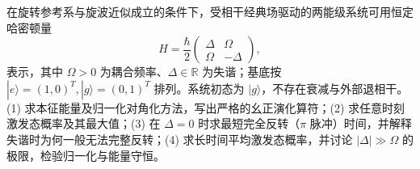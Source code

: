 在旋转参考系与旋波近似成立的条件下，受相干经典场驱动的两能级系统可用恒定哈密顿量
\[
H=\frac{\hbar}{2}\begin{pmatrix}\Delta&\Omega\\\Omega&-\Delta\end{pmatrix},
\]
表示，其中 \(\Omega>0\) 为耦合频率、\(\Delta\in\mathbb R\) 为失谐；基底按 \(|e\rangle=(1,0)^T,|g\rangle=(0,1)^T\) 排列。系统初态为 \(|g\rangle\)，不存在衰减与外部退相干。
(1) 求本征能量及归一化对角化方法，写出严格的幺正演化算符；(2) 求任意时刻激发态概率及其最大值；(3) 在 \(\Delta=0\) 时求最短完全反转（\(\pi\) 脉冲）时间，并解释失谐时为何一般无法完整反转；(4) 求长时间平均激发态概率，并讨论 \(|\Delta|\gg\Omega\) 的极限，检验归一化与能量守恒。
